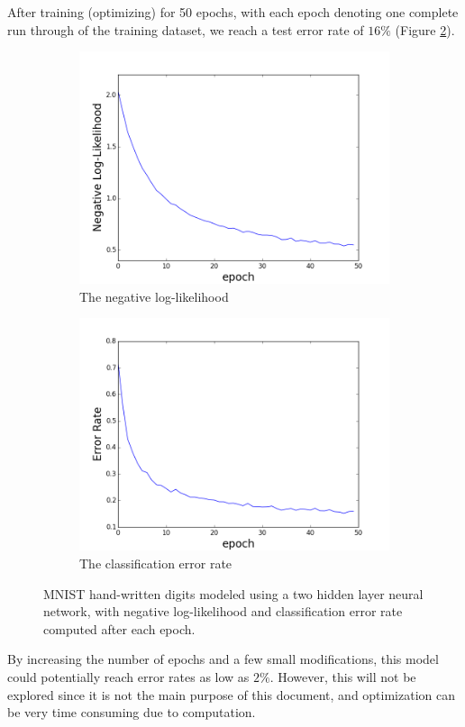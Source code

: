 \documentclass[12pt]{article}
\begin{document}
After training (optimizing) for 50 epochs,
with each epoch denoting one complete run through of the training 
dataset,
we reach a test error rate of $16\%$ (Figure \ref{fig:mnist_err}).
%
\begin{figure}[h]
\centering
\begin{subfigure}{.45\textwidth}
  \centering
  \includegraphics[width=\linewidth]{fig_mnist_nll.png}
  \caption{The negative log-likelihood}
  \label{fig:mnist_nll}
\end{subfigure}%
\begin{subfigure}{.45\textwidth}
  \centering
  \includegraphics[width=\linewidth]{fig_mnist_err.png}
  \caption{The classification error rate}
  \label{fig:mnist_err}
\end{subfigure}
\caption{MNIST hand-written digits modeled using a two hidden
  layer neural network, with negative log-likelihood and
  classification error rate computed after each epoch.}
\label{fig:mnist_results}
\end{figure}
%
By increasing the number of epochs and a few small modifications,
this model could potentially reach error rates as low as $2\%$.
However, this will not be explored since it is not
the main purpose of this document,
and optimization can be very time consuming due to computation.
\end{document}
